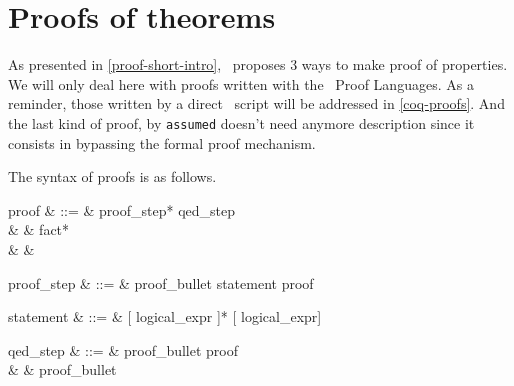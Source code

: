 


\section{Proofs of  theorems}
As presented in \ref{proof-short-intro}, \focal\ proposes 3 ways to
make proof of properties. We will only deal here with proofs written
with the \focal\ Proof Languages. As a reminder, those written by a
direct \coq\ script will be addressed in \ref{coq-proofs}. And the
last kind of proof, by {\tt assumed} doesn't need anymore description
since it consists in bypassing the formal proof mechanism.

The syntax of proofs is as follows.
\begin{syntax}
proof & ::=  & proof\_step* qed\_step \\
      & \mid &  fact* \\
      & \mid & 
\end{syntax}

\begin{syntax}
proof\_step & ::=  & proof\_bullet statement proof
\end{syntax}

\begin{syntax}
statement & ::=  & [ logical\_expr \terminal{,}]*
                   [ logical\_expr]
\end{syntax}

\begin{syntax}
qed\_step & ::=  & proof\_bullet  proof \\
          & \mid & proof\_bullet  
\end{syntax}
